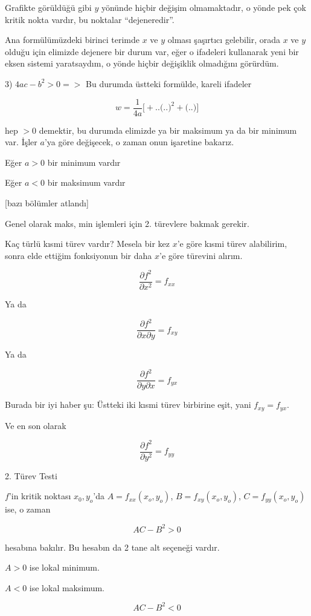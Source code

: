 \documentclass[12pt,fleqn]{article}\usepackage{../../common}
\begin{document}
Grafikte görüldüğü gibi $y$ yönünde hiçbir değişim olmamaktadır, o yönde pek çok
kritik nokta vardır, bu noktalar ``dejeneredir''.

Ana formülümüzdeki birinci terimde $x$ ve $y$ olması şaşırtıcı gelebilir, orada
$x$ ve $y$ olduğu için elimizde dejenere bir durum var, eğer o ifadeleri
kullanarak yeni bir eksen sistemi yaratsaydım, o yönde hiçbir değişiklik
olmadığını görürdüm.

3) $4ac - b^2 > 0 => $ Bu durumda üstteki formülde, kareli ifadeler 

$$w = \frac{1}{4a} 
\bigg[
+ .. \bigg( .. \bigg)^2 +
\bigg( .. \bigg)
\bigg]
$$

hep $>0$ demektir, bu durumda elimizde ya bir maksimum ya da bir minimum
var. İşler $a$'ya göre değişecek, o zaman onun işaretine bakarız. 

Eğer $a > 0$ bir minimum vardır

Eğer $a < 0$ bir maksimum vardır

[bazı bölümler atlandı]

Genel olarak maks, min işlemleri için 2. türevlere bakmak gerekir. 

Kaç türlü kısmi türev vardır? Mesela bir kez $x$'e göre kısmi türev alabilirim,
sonra elde ettiğim fonksiyonun bir daha $x$'e göre türevini alırım. 

$$ \frac{\partial f^2}{\partial x^2} = f_{xx}$$

Ya da

$$ 
\frac{\partial f^2}{\partial x \partial y} = f_{xy}
$$

Ya da 

$$ 
\frac{\partial f^2}{\partial y \partial x} = f_{yx}
$$

Burada bir iyi haber şu: Üstteki iki kısmi türev birbirine eşit, yani
$f_{xy} = f_{yx}$.

Ve en son olarak

$$ \frac{\partial f^2}{\partial y^2} = f_{yy}$$

2. Türev Testi

$f$'in kritik noktası $x_0,y_o$'da $A = f_{xx}(x_o,y_o)$, $B =
f_{xy}(x_o,y_o)$, $C = f_{yy}(x_o,y_o)$ ise, o zaman 

$$ AC - B^2 > 0 $$

hesabına bakılır. Bu hesabın da 2 tane alt seçeneği vardır. 

$A > 0$ ise lokal minimum. 

$A < 0$ ise lokal maksimum. 

$$ AC - B^2 < 0 $$
\end{document}
